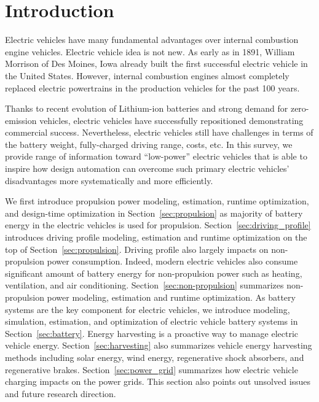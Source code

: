 
\section{Introduction}

Electric vehicles have many fundamental advantages over internal combustion engine vehicles. Electric vehicle idea is not new. As early as in 1891, William Morrison of Des Moines, Iowa already built the first successful electric vehicle in the United States. However, internal combustion engines almost completely replaced electric powertrains in the production vehicles for the past 100 years. 

Thanks to recent evolution of Lithium-ion batteries and strong demand for zero-emission vehicles, electric vehicles have successfully repositioned demonstrating commercial success. Nevertheless, electric vehicles still have challenges in terms of the battery weight, fully-charged driving range, costs, etc. In this survey, we provide range of information toward “low-power” electric vehicles that is able to inspire how design automation can overcome such primary electric vehicles’ disadvantages more systematically and more efficiently. 

We first introduce propulsion power modeling, estimation, runtime optimization, and design-time optimization in Section~\ref{sec:propulsion} as majority of battery energy in the electric vehicles is used for propulsion. 
%
%
Section~\ref{sec:driving_profile} introduces driving profile modeling, estimation and runtime optimization on the top of Section~\ref{sec:propulsion}. 
%
Driving profile also largely impacts on non-propulsion power consumption. Indeed, modern electric vehicles also consume significant amount of battery energy for non-propulsion power such as heating, ventilation, and air conditioning. Section~\ref{sec:non-propulsion} summarizes non-propulsion power modeling, estimation and runtime optimization.
%
As battery systems are the key component for electric vehicles, we introduce modeling, simulation, estimation, and optimization of electric vehicle battery systems in Section~\ref{sec:battery}. 
%
Energy harvesting is a proactive way to manage electric vehicle energy. Section~\ref{sec:harvesting} also summarizes vehicle energy harvesting methods including solar energy, wind energy, regenerative shock absorbers, and regenerative brakes. 
%
Section~\ref{sec:power_grid} summarizes how electric vehicle charging impacts on the power grids. This section also points out unsolved issues and future research direction.


